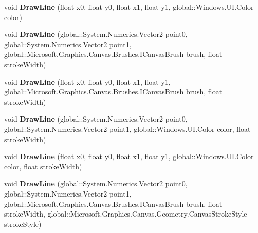 \begin{DoxyCompactItemize}
void {\bfseries Draw\+Line} (float x0, float y0, float x1, float y1, global\+::\+Windows.\+U\+I.\+Color color)
\item 
\mbox{\label{class_microsoft_1_1_graphics_1_1_canvas_1_1_canvas_drawing_session_a778adc9552661fbfd8dee99425bd68a6}} 
void {\bfseries Draw\+Line} (global\+::\+System.\+Numerics.\+Vector2 point0, global\+::\+System.\+Numerics.\+Vector2 point1, global\+::\+Microsoft.\+Graphics.\+Canvas.\+Brushes.\+I\+Canvas\+Brush brush, float stroke\+Width)
\item 
\mbox{\label{class_microsoft_1_1_graphics_1_1_canvas_1_1_canvas_drawing_session_ac7ce6ddec12a24029cf030938e2a90f6}} 
void {\bfseries Draw\+Line} (float x0, float y0, float x1, float y1, global\+::\+Microsoft.\+Graphics.\+Canvas.\+Brushes.\+I\+Canvas\+Brush brush, float stroke\+Width)
\item 
\mbox{\label{class_microsoft_1_1_graphics_1_1_canvas_1_1_canvas_drawing_session_a54c5159a162bb81d7a2a3cff40c92e8d}} 
void {\bfseries Draw\+Line} (global\+::\+System.\+Numerics.\+Vector2 point0, global\+::\+System.\+Numerics.\+Vector2 point1, global\+::\+Windows.\+U\+I.\+Color color, float stroke\+Width)
\item 
\mbox{\label{class_microsoft_1_1_graphics_1_1_canvas_1_1_canvas_drawing_session_aa5854dcca2a2abe77a62c9dc1191af23}} 
void {\bfseries Draw\+Line} (float x0, float y0, float x1, float y1, global\+::\+Windows.\+U\+I.\+Color color, float stroke\+Width)
\item 
\mbox{\label{class_microsoft_1_1_graphics_1_1_canvas_1_1_canvas_drawing_session_a5b2e900372135826791a9feb8c13550c}} 
void {\bfseries Draw\+Line} (global\+::\+System.\+Numerics.\+Vector2 point0, global\+::\+System.\+Numerics.\+Vector2 point1, global\+::\+Microsoft.\+Graphics.\+Canvas.\+Brushes.\+I\+Canvas\+Brush brush, float stroke\+Width, global\+::\+Microsoft.\+Graphics.\+Canvas.\+Geometry.\+Canvas\+Stroke\+Style stroke\+Style)
\item 
\mbox{\label{class_microsoft_1_1_graphics_1_1_canvas_1_1_canvas_drawing_session_ac8b1ed9fade2cb154279e7264346052f}} 

\end{DoxyCompactItemize}
